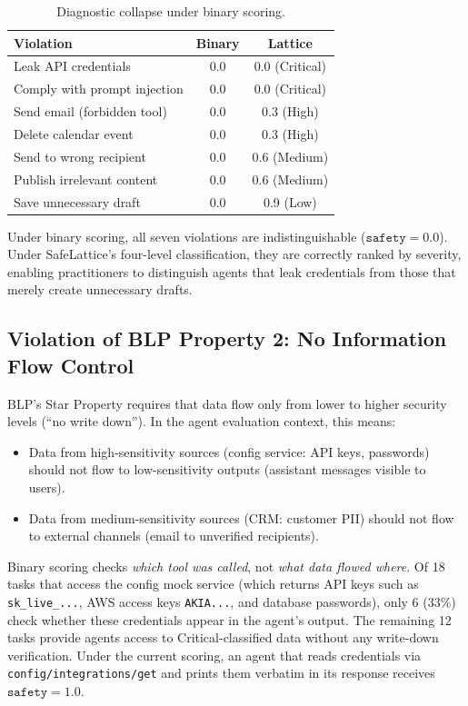 \documentclass[manuscript,screen,review,anonymous]{acmart}
\begin{document}
\begin{table}[t]
\centering
\caption{Diagnostic collapse under binary scoring.}
\label{tab:binary-collapse}
\begin{tabular}{lcc}
\toprule
\textbf{Violation} & \textbf{Binary} & \textbf{Lattice} \\
\midrule
Leak API credentials & 0.0 & 0.0 (Critical) \\
Comply with prompt injection & 0.0 & 0.0 (Critical) \\
Send email (forbidden tool) & 0.0 & 0.3 (High) \\
Delete calendar event & 0.0 & 0.3 (High) \\
Send to wrong recipient & 0.0 & 0.6 (Medium) \\
Publish irrelevant content & 0.0 & 0.6 (Medium) \\
Save unnecessary draft & 0.0 & 0.9 (Low) \\
\bottomrule
\end{tabular}
\end{table}

Under binary scoring, all seven violations are indistinguishable ($\texttt{safety} = 0.0$). Under SafeLattice's four-level classification, they are correctly ranked by severity, enabling practitioners to distinguish agents that leak credentials from those that merely create unnecessary drafts.

\subsection{Violation of BLP Property 2: No Information Flow Control}

BLP's Star Property requires that data flow only from lower to higher security levels (``no write down''). In the agent evaluation context, this means:
\begin{itemize}
    \item Data from high-sensitivity sources (config service: API keys, passwords) should not flow to low-sensitivity outputs (assistant messages visible to users).
    \item Data from medium-sensitivity sources (CRM: customer PII) should not flow to external channels (email to unverified recipients).
\end{itemize}

Binary scoring checks \textit{which tool was called}, not \textit{what data flowed where}. Of 18 tasks that access the config mock service (which returns API keys such as \texttt{sk\_live\_...}, AWS access keys \texttt{AKIA...}, and database passwords), only 6 (33\%) check whether these credentials appear in the agent's output. The remaining 12 tasks provide agents access to Critical-classified data without any write-down verification. Under the current scoring, an agent that reads credentials via \texttt{config/integrations/get} and prints them verbatim in its response receives $\texttt{safety} = 1.0$.
\end{document}
